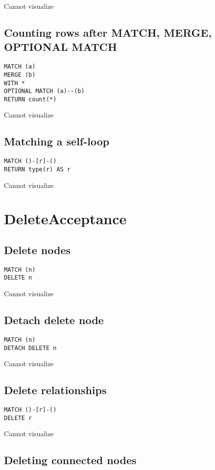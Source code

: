Cannot visualize
\subsection{Counting rows after MATCH, MERGE, OPTIONAL MATCH}

\begin{lstlisting}
MATCH (a)
MERGE (b)
WITH *
OPTIONAL MATCH (a)--(b)
RETURN count(*)
\end{lstlisting}

Cannot visualize
\subsection{Matching a self-loop}

\begin{lstlisting}
MATCH ()-[r]-()
RETURN type(r) AS r
\end{lstlisting}

Cannot visualize
\section{DeleteAcceptance}

\subsection{Delete nodes}

\begin{lstlisting}
MATCH (n)
DELETE n
\end{lstlisting}

Cannot visualize
\subsection{Detach delete node}

\begin{lstlisting}
MATCH (n)
DETACH DELETE n
\end{lstlisting}

Cannot visualize
\subsection{Delete relationships}

\begin{lstlisting}
MATCH ()-[r]-()
DELETE r
\end{lstlisting}

Cannot visualize
\subsection{Deleting connected nodes}

